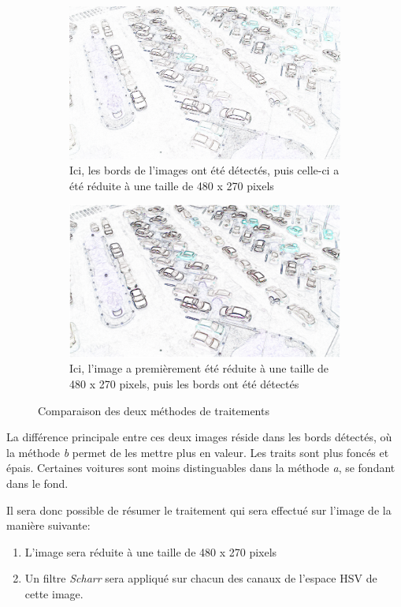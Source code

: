 \begin{figure}[H]
    \begin{subfigure}{\textwidth}
        \centering
        \includegraphics[width=.6\linewidth]{img/conception/image_process/edge-downsample/2.png}
        \caption{Ici, les bords de l'images ont été détectés, puis celle-ci a été réduite à une taille de 480 x 270 pixels}
    \end{subfigure}%

    \bigskip
    \begin{subfigure}{\textwidth}
        \centering
        \includegraphics[width=.6\linewidth]{img/conception/image_process/downsample-edge/4.png}
        \caption{Ici, l'image a premièrement été réduite à une taille de 480 x 270 pixels, puis les bords ont été détectés}
    \end{subfigure}%
    \centering
    \caption{Comparaison des deux méthodes de traitements}
    \label{fig:image_process_compare}
\end{figure}

La différence principale entre ces deux images réside dans les bords détectés, où la méthode \textit{b} permet de les mettre plus en valeur. Les traits sont plus foncés et épais. Certaines voitures sont moins distinguables dans la méthode \textit{a}, se fondant dans le fond.

Il sera donc possible de résumer le traitement qui sera effectué sur l'image de la manière suivante:
\begin{enumerate}
    \item L'image sera réduite à une taille de 480 x 270 pixels
    \item Un filtre \textit{Scharr} sera appliqué sur chacun des canaux de l'espace HSV de cette image.
\end{enumerate}


